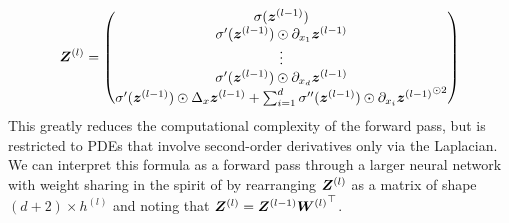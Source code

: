 \begin{align}
    {\bm{Z}}^{(l)}
    =
     \begin{pmatrix}
         \sigma({\bm{z}}^{(l-1)}) \\
         \sigma'({\bm{z}}^{(l-1)})\odot \partial_{x_1}{\bm{z}}^{(l-1)} \\
         \vdots \\
         \sigma'({\bm{z}}^{(l-1)})\odot \partial_{x_d}{\bm{z}}^{(l-1)} \\
         \sigma'({\bm{z}}^{(l-1)})\odot\Delta_x{\bm{z}}^{(l-1)} + \sum_{i=1}^d \sigma''({\bm{z}}^{(l-1)})\odot \partial_{x_i}{{\bm{z}}^{(l-1)}}^{\odot 2}
     \end{pmatrix}
     \label{eq:forward-laplacian-nonlinear-layer-compact}
\end{align}
This greatly reduces the computational complexity of the forward pass, but is restricted to PDEs that involve second-order derivatives only via the Laplacian. %
We can interpret this formula as a forward pass through a larger neural network with weight sharing in the spirit of \cite{eschenhagen2023kroneckerfactored}  by rearranging ${\bm{Z}}^{(l)}$ as a matrix of shape $(d+2)\times h^{(l)}$ and noting that ${\bm{Z}}^{(l)} = {\bm{Z}}^{(l-1)}{{\bm{W}}^{(l)}}^\top$.



